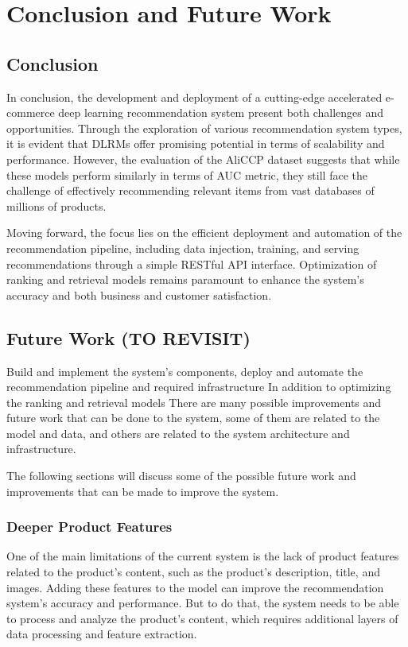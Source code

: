 \chapter{Conclusion and Future Work}
\minitoc

\section{Conclusion}
In conclusion, the development and deployment of a cutting-edge accelerated e-commerce deep learning recommendation system present both challenges and opportunities. Through the exploration of various recommendation system types, it is evident that DLRMs offer promising potential in terms of scalability and performance.
 However, the evaluation of the AliCCP dataset suggests that while these models perform similarly in terms of AUC metric, they still face the challenge of effectively recommending relevant items from vast databases of millions of products.

Moving forward, the focus lies on the efficient deployment and automation of the recommendation pipeline, including data injection, training, and serving recommendations through a simple RESTful API interface.
 Optimization of ranking and retrieval models remains paramount to enhance the system's accuracy and both business and customer satisfaction.

\section{Future Work (TO REVISIT)}
Build and implement the system's components, deploy and automate the recommendation pipeline and required infrastructure 
In addition to optimizing the ranking and retrieval models
There are many possible improvements and future work that can be done to the system, 
some of them are related to the model and data, and others are related to the system architecture and infrastructure.

The following sections will discuss some of the possible future work and improvements that can be made to improve the system.

\subsection{Deeper Product Features}

One of the main limitations of the current system is the lack of product features related to the product's content, such as the product's description, title, and images.
Adding these features to the model can improve the recommendation system's accuracy and performance. 
But to do that, the system needs to be able to process and analyze the product's content, which requires additional layers of data processing and feature extraction.

